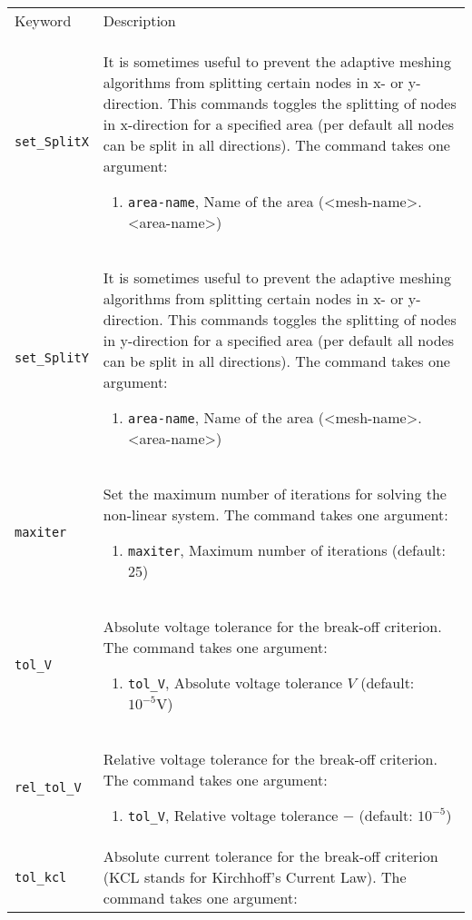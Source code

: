 \documentclass[noshowpacs,preprintnumbers,amsmath,amssymb, letter]{revtex4}
\begin{document}
\begin{longtable}{p{}p{}}
\hline
Keyword & Description \\
\texttt{set\_SplitX}	&  It is sometimes useful to prevent the adaptive meshing algorithms from splitting certain nodes in x- or y-direction. This commands toggles the splitting of nodes in x-direction for a specified area (per default all nodes can be split in all directions). The command takes one argument:
\begin{enumerate}
\item \texttt{area-name}, Name of the area (\textless mesh-name\textgreater .\textless area-name\textgreater )
\end{enumerate}\\
\texttt{set\_SplitY}	&  It is sometimes useful to prevent the adaptive meshing algorithms from splitting certain nodes in x- or y-direction. This commands toggles the splitting of nodes in y-direction for a specified area (per default all nodes can be split in all directions). The command takes one argument:
\begin{enumerate}
\item \texttt{area-name}, Name of the area (\textless mesh-name\textgreater .\textless area-name\textgreater )
\end{enumerate}\\
\texttt{maxiter}	&  Set the maximum number of iterations for solving the non-linear system. The command takes one argument:
\begin{enumerate}
\item \texttt{maxiter}, Maximum number of iterations (default: 25)
\end{enumerate}\\
\texttt{tol\_V}	&  Absolute voltage tolerance for the break-off criterion. The command takes one argument:
\begin{enumerate}
\item \texttt{tol\_V}, Absolute voltage tolerance $V$ (default: $10^{-5} \text{V}$)
\end{enumerate}\\
\texttt{rel\_tol\_V}	&  Relative voltage tolerance for the break-off criterion. The command takes one argument:
\begin{enumerate}
\item \texttt{tol\_V}, Relative voltage tolerance $-$ (default: $10^{-5}$)
\end{enumerate}\\
\texttt{tol\_kcl}	&  Absolute current tolerance for the break-off criterion (KCL stands for Kirchhoff's Current Law). The command takes one argument:

\end{longtable}
\end{document}
